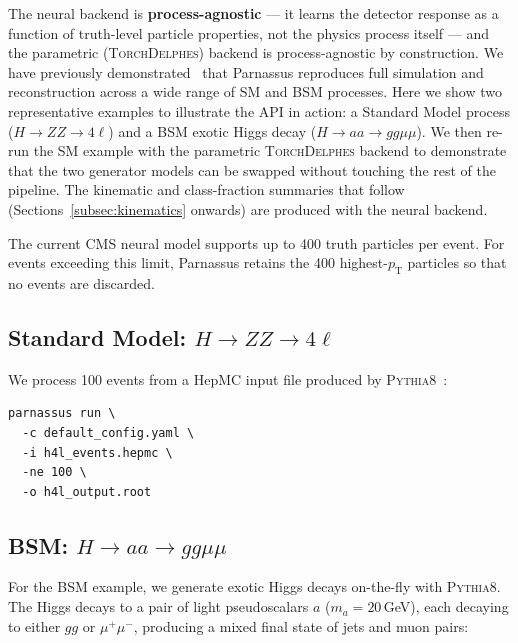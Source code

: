 \documentclass[11pt,a4paper]{article}          %
\begin{document}
The neural backend is \textbf{process-agnostic} --- it learns the detector
response as a function of truth-level particle properties, not the physics
process itself --- and the parametric (\textsc{TorchDelphes}) backend is
process-agnostic by construction. We have previously
demonstrated~\cite{parnassus_v1,parnassus_v2} that Parnassus reproduces full
simulation and reconstruction across a wide range of SM and BSM processes.
Here we show two representative examples to illustrate the API in action: a
Standard Model process ($H \to ZZ \to 4\ell$) and a BSM exotic Higgs decay
($H \to aa \to gg\mu\mu$). We then re-run the SM example with the parametric
\textsc{TorchDelphes} backend to demonstrate that the two generator models
can be swapped without touching the rest of the pipeline. The kinematic and
class-fraction summaries that follow (Sections~\ref{subsec:kinematics}
onwards) are produced with the neural backend.

The current CMS neural model supports up to 400 truth particles per event.
For events exceeding this limit, Parnassus retains the 400 highest-$p_\mathrm{T}$
particles so that no events are discarded.

\subsection{Standard Model: $H \to ZZ \to 4\ell$}

We process 100 events from a HepMC input file produced by
\textsc{Pythia8}~\cite{pythia8}:

\begin{lstlisting}[style=bash]
parnassus run \
  -c default_config.yaml \
  -i h4l_events.hepmc \
  -ne 100 \
  -o h4l_output.root
\end{lstlisting}

\subsection{BSM: $H \to aa \to gg\mu\mu$}

For the BSM example, we generate exotic Higgs decays on-the-fly with
\textsc{Pythia8}. The Higgs decays to a pair of light pseudoscalars $a$
($m_a = 20$\,GeV), each decaying to either $gg$ or $\mu^+\mu^-$, producing
a mixed final state of jets and muon pairs:
\end{document}

